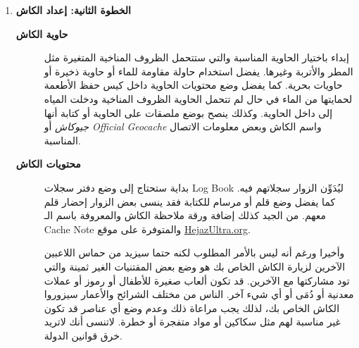 \documentclass[12pt,a4paper,onecolumn,notitlepage]{book}
\begin{document}
\begin{enumerate}
\begin{enumerate}
أنت الشخص المسؤول عن الكاش أولا وأخيرا وهو مسؤوليتك وحدك، لذلك يجب أن تكون مُلِمّاً بالقوانين والأنظمة في بلدك (المملكة العربية السعودية). كما يجب أن تراعي خصوصية الآخرين وكن على يقين بأن هناك بعض المَارّة والمشاة في ذلك المكان.
\item راعي أن لا يكون هناك تدمير للبيئة أو الحياة الفطرية أو الطبيعية في الحصول على الكاش. نحن نحب الطبيعة.
\item وضع الكاش في مكان مقابل نوافذ أو مبانٍ مكتبية قد يثير بعض الشكوك ويعرض الكاش للاكتشاف بسهولة من قبل الـ \textenglish{Mugglers}\footnote{الـ \textenglish{Mugglers} هم عامة الناس واللذين لا يعلمون شيئاً عن اللعبة وقد يثير فضولهم رؤية شخص يقوم باكتشاف الكاش أو إعادته إلى مكانه ليقوموا بالعبث به وغالبا أخذ الحاوية وبالتالي تخريب اللعبة على بقية اللاعبين.}
\end{enumerate}
\item\textbf{الخطوة الثانية: إعداد الكاش}
\begin{description}
\item[\textbf{حاوية الكاش}]
إبداء باختيار الحاوية المناسبة والتي ستتحمل الظروف المناخية المتغيرة مثل المطر والأتربة وغيرها. يفضل استخدام حاولة مقاومة للماء أو حاوية ذخيرة أو حاويات بحرية. كما يفضل وضع محتويات الحاوية داخل كيس حفظ الأطعمة لحمايتها من الماء في حال لم تتحمل الحاوية الظروف المناخية ودخلت المياه إلى داخل الحاوية. وكذلك ينصح بوضع ملصقات على الحاوية أو كتابة أنها \emph{جيوكاش} أو \emph{\textenglish{Official Geocache}} واسم الكاش وبعض معلومات الاتصال المناسبة.
\item[\textbf{محتويات الكاش}]
بداية ستحتاج إلى وضع دفتر سجلات \textenglish{Log Book} ليُدَوِّن الزوار سجلاتهم فيه. كما يفضل وضع قلم أو مرسام للكتابة فقد ينسى بعض الزوار إحضار قلم معهم.
من الجيد كذلك إضافة ورقة ملاحظة الكاش والمعروفة باسم الـ \textenglish{Cache Note} والمتوفرة على موقع \textenglish{\href{http://www.HejazUltra.org}{HejazUltra.org}}.

وأخيرا ورغم أنه ليس بالأمر المطلوب لكنه حتما سيزيد من حماس اللاعبين الآخرين لزيارة الكاش الخاص بك هو وضع بعض المقتنيات الغير ثمينة والتي تود مشاركتها مع الآخرين. قد تكون ألعاب صغيرة للأطفال أو رموز أو عملات معدنية أو دُمَى أو أي شيء آخر. الناس من مختلف الشرائح والأعمار سيزوروا الكاش الخاص بك، لذلك يجب مراعاة ذلك وعدم وضع أي عناصر قد تكون غير مناسبة لهم مثل سكاكين أو مواد متفجرة أو خطرة. لاتنسى أنك لاتريد خرق قوانين الدولة.


\end{description}
\end{enumerate}
\end{document}
